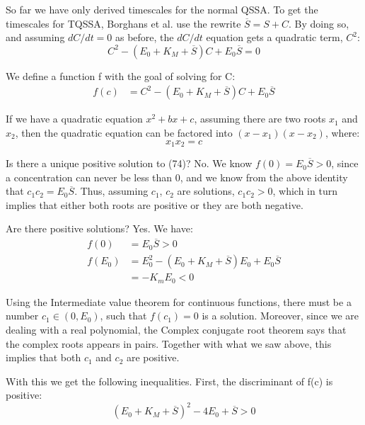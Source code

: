 \documentclass[12pt]{article}
\begin{document}
So far we have only derived timescales for the normal QSSA. To get the
timescales for TQSSA, Borghans et al. use the rewrite $\overline{S} =
S + C$. By doing so, and assuming $dC/dt=0$ as before, the $dC/dt$
equation gets a quadratic term, $C^2$:
\begin{equation}
  C^2 - (E_0 + K_M + \overline{S})C + E_0 \overline{S} = 0
\end{equation}

We define a function f with the goal of solving for C:
\begin{align}
  f(c) &= C^2 - (E_0 + K_M + \overline{S})C + E_0 \overline{S}
\end{align}

If we have a quadratic equation $x^2+bx+c$, assuming there are two
roots $x_1$ and $x_2$, then the quadratic equation can be factored
into $(x - x_1)(x - x_2)$, where:
\begin{equation}
  x_1 x_2 = c
\end{equation}

Is there a unique positive solution to (74)? No. We know $f(0) = E_0
\overline{S} > 0$, since a concentration can never be less than 0, and
we know from the above identity that $c_1 c_2 = E_0
\overline{S}$. Thus, assuming $c_1$, $c_2$ are solutions, $c_1 c_2 >
0$, which in turn implies that either both roots are positive or they
are both negative.

Are there positive solutions? Yes. We have:
\begin{align}
  f(0) &= E_0 \overline{S} > 0 \\
  f(E_0) &= E_0^2 - (E_0 + K_M + \overline{S})E_0 + E_0 \overline{S} \\
         &= - K_m E_0 < 0
\end{align}

Using the Intermediate value theorem for continuous functions, there
must be a number $c_1 \in (0,E_0)$, such that $f(c_1) = 0$ is a
solution. Moreover, since we are dealing with a real polynomial, the
Complex conjugate root theorem says that the complex roots appears in
pairs. Together with what we saw above, this implies that both $c_1$
and $c_2$ are positive.

With this we get the following inequalities. First, the discriminant
of f(c) is positive:
\begin{equation}
  (E_0 + K_M + \overline{S})^2 - 4 E_0 + \overline{S} > 0
\end{equation}
\end{document}
